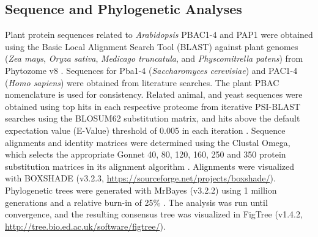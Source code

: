\subsection{Sequence and Phylogenetic Analyses}
Plant protein sequences related to \textit{Arabidopsis} PBAC1-4 and PAP1 were obtained using the Basic Local Alignment Search Tool (BLAST) against plant genomes (\textit{Zea mays}, \textit{Oryza sativa}, \textit{Medicago truncatula}, and \textit{Physcomitrella patens}) from Phytozome v8 \citep{goodstein12}. Sequences for Pba1-4 (\textit{Saccharomyces cerevisiae}) and PAC1-4 (\textit{Homo sapiens}) were obtained from literature searches. The plant PBAC nomenclature is used for consistency. Related animal, and yeast sequences were obtained using top hits in each respective proteome from iterative PSI-BLAST searches using the BLOSUM62 substitution matrix, and hits above the default expectation value (E-Value) threshold of 0.005 in each iteration \citep{altschul97}. Sequence alignments and identity matrices were determined using the Clustal Omega, which selects the appropriate Gonnet 40, 80, 120, 160, 250 and 350 protein substitution matrices in its alignment algorithm \citep{gonnet92, sievers14, sievers11}. Alignments were visualized with BOXSHADE (v3.2.3, \url{https://sourceforge.net/projects/boxshade/}). Phylogenetic trees were generated with MrBayes (v3.2.2) using 1 million generations and a relative burn-in of 25\% \citep{ronquist12}. The analysis was run until convergence, and the resulting consensus tree was visualized in FigTree (v1.4.2, \url{http://tree.bio.ed.ac.uk/software/figtree/}). 

